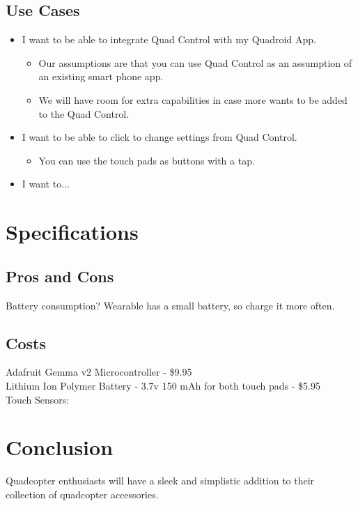 \documentclass[12pt,letterpaper]{article}
\begin{document}
\subsection*{Use Cases}
\begin{itemize}
\item I want to be able to integrate Quad Control with my Quadroid App.
\begin{itemize}
\item Our assumptions are that you can use Quad Control as an assumption of an existing smart phone app.
\item We will have room for extra capabilities in case more wants to be added to the Quad Control.
\end{itemize}
\item I want to be able to click to change settings from Quad Control.
\begin{itemize}
\item You can use the touch pads as buttons with a tap.
\end{itemize}
\item I want to...
\end{itemize}



\section*{Specifications}
\subsection*{Pros and Cons}
Battery consumption?
Wearable has a small battery, so charge it more often.
\subsection*{Costs}
Adafruit Gemma v2 Microcontroller - \$9.95 \\
Lithium Ion Polymer Battery - 3.7v 150 mAh for both touch pads - \$5.95 \\
Touch Sensors: \\



\section*{Conclusion}
Quadcopter enthusiasts will have a sleek and simplistic addition to their collection of quadcopter accessories. 

\newpage
\nocite{*}


\end{document}
